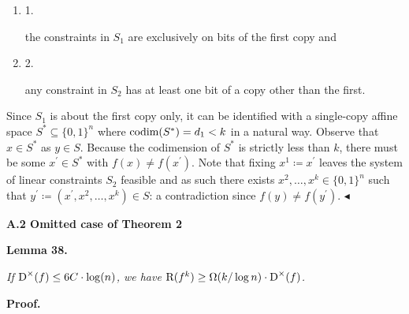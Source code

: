\begin{enumerate}


\item[] 
1. 


the constraints in $S_{1}$ are exclusively on bits of the first copy and\par





\item[] 
2. 


any constraint in $S_{2}$ has at least one bit of a copy other than the first.\par





\end{enumerate}


Since $S_{1}$ is about the first copy only, it can be identified with a single-copy affine space $S^{*}\subseteq\{0,1\}^{n}$ where $\textup{codim}(S^{*})=d_{1}<k$ in a natural way. Observe that $x\in S^{*}$ as $y\in S$. Because the codimension of $S^{*}$ is strictly less than $k$, there must be some $x^{\prime}\in S^{*}$ with $f(x)\neq f(x^{\prime})$. Note that fixing $x^{1}\coloneqq x^{\prime}$ leaves the system of linear constraints $S_{2}$ feasible and as such there exists $x^{2},\dots,x^{k}\in\{0,1\}^{n}$ such that $y^{\prime}\coloneqq(x^{\prime},x^{2},\dots,x^{k})\in S$: a contradiction since $f(y)\neq f(y^{\prime})$.
$\blacktriangleleft$\par






\par\medskip\noindent\textbf{
A.2 Omitted case of Theorem 2
}\par





\par\medskip\noindent\textbf{
\textbf{Lemma 38}\textbf{.}
}\par



\emph{If ${\textup{D}}^{\times}(f)\leq 6C\cdot\log(n)$, we have ${\textup{R}}(f^{k})\geq\Omega(k/\log n)\cdot{\textup{D}}^{\times}(f)$.}\par






\par\medskip\noindent\textbf{Proof.}\par




